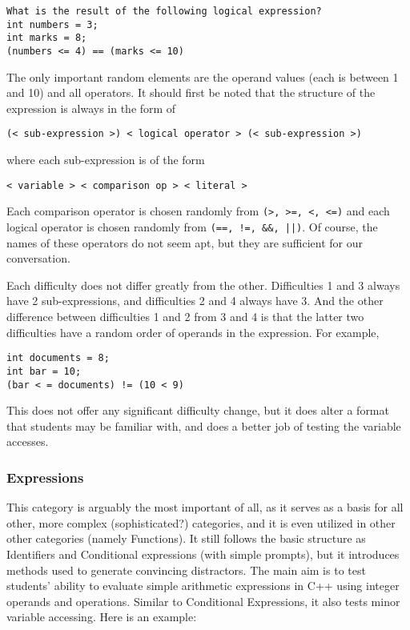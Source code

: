 \documentclass{article}
\begin{document}
\begin{Verbatim}
What is the result of the following logical expression? 
int numbers = 3; 
int marks = 8; 
(numbers <= 4) == (marks <= 10) 
\end{Verbatim}

The only important random elements are the operand values (each is between 1 and 10) and all operators. It should first be noted that the structure of the expression
is always in the form of 
\begin{Verbatim}
(< sub-expression >) < logical operator > (< sub-expression >)
\end{Verbatim}
where each sub-expression is of the form 
\begin{Verbatim}
< variable > < comparison op > < literal >
\end{Verbatim}
Each comparison operator is chosen randomly from \verb;(>, >=, <, <=); and each logical operator is chosen randomly from \verb;(==, !=, &&, ||);. Of course, the names
of these operators do not seem apt, but they are sufficient for our conversation.

Each difficulty does not differ greatly from the other. Difficulties 1 and 3 always have 2 sub-expressions, and difficulties 2 and 4 always have 3. And the other
difference between difficulties 1 and 2 from 3 and 4 is that the latter two difficulties have a random order of operands in the expression. For example,

\begin{lstlisting}
int documents = 8;
int bar = 10;
(bar < = documents) != (10 < 9)
\end{lstlisting}

This does not offer any significant difficulty change, but it does alter a format that students may be familiar with, and does a better job of testing the variable accesses.


\subsubsection{Expressions}
This category is arguably the most important of all, as it serves as a basis for all other, more complex (sophisticated?) categories, and it is even utilized in other other categories
(namely Functions). It still follows the basic structure as Identifiers and Conditional expressions (with simple prompts), but it introduces methods used to generate convincing distractors.
The main aim is to test students' ability to evaluate simple arithmetic expressions in C++ using integer operands and operations. Similar to Conditional Expressions, it also
tests minor variable accessing. Here is an example:
\end{document}
